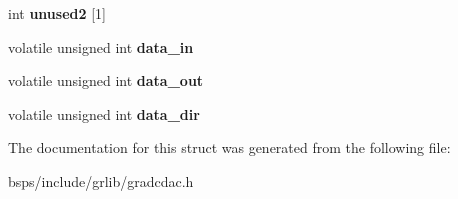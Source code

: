 \begin{DoxyCompactItemize}
\item 
\mbox{\label{structgradcdac__regs_aa5c803a794893db71025b97144b97656}} 
int {\bfseries unused2} \mbox{[}1\mbox{]}
\item 
\mbox{\label{structgradcdac__regs_a822fb4ca4f9abec13985dbda27c61e87}} 
volatile unsigned int {\bfseries data\+\_\+in}
\item 
\mbox{\label{structgradcdac__regs_a41b248911ccb911f7f08442ae2849d26}} 
volatile unsigned int {\bfseries data\+\_\+out}
\item 
\mbox{\label{structgradcdac__regs_ab54ea35de5798f4ea8c5259829a48af0}} 
volatile unsigned int {\bfseries data\+\_\+dir}
\end{DoxyCompactItemize}


The documentation for this struct was generated from the following file\+:\begin{DoxyCompactItemize}
\item 
bsps/include/grlib/gradcdac.\+h\end{DoxyCompactItemize}
